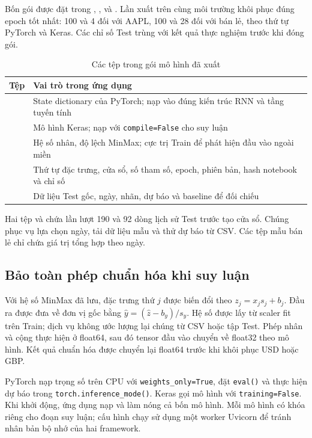 \documentclass[12pt,a4paper]{report}
\begin{document}
Bốn gói được đặt trong , ,  và . Lần xuất trên cùng môi trường khôi phục đúng epoch tốt nhất: 100 và 4 đối với AAPL, 100 và 28 đối với bán lẻ, theo thứ tự PyTorch và Keras. Các chỉ số Test trùng với kết quả thực nghiệm trước khi đóng gói.

\begin{table}[H]\centering\small
\caption{Các tệp trong gói mô hình đã xuất}\label{tab:deployment-artifacts}
\begin{tabularx}{\linewidth}{@{}p{3.6cm}Y@{}}\toprule
Tệp & Vai trò trong ứng dụng \\\midrule
{} & State dictionary của PyTorch; nạp vào đúng kiến trúc RNN và tầng tuyến tính \\
 & Mô hình Keras; nạp với \texttt{compile=False} cho suy luận \\
 & Hệ số nhân, độ lệch MinMax; cực trị Train để phát hiện đầu vào ngoài miền \\
 & Thứ tự đặc trưng, cửa sổ, số tham số, epoch, phiên bản, hash notebook và chỉ số \\
 & Dữ liệu Test gốc, ngày, nhãn, dự báo và baseline để đối chiếu \\\bottomrule
\end{tabularx}
\end{table}

Hai tệp  và  chứa lần lượt 190 và 92 dòng lịch sử Test trước tạo cửa sổ. Chúng phục vụ lựa chọn ngày, tải dữ liệu mẫu và thử dự báo từ CSV. Các tệp mẫu bán lẻ chỉ chứa giá trị tổng hợp theo ngày.

\subsection{Bảo toàn phép chuẩn hóa khi suy luận}
Với hệ số MinMax đã lưu, đặc trưng thứ $j$ được biến đổi theo $z_j=x_j s_j+b_j$. Đầu ra được đưa về đơn vị gốc bằng $\widehat{y}=(\widehat{z}-b_y)/s_y$. Hệ số được lấy từ scaler fit trên Train; dịch vụ không ước lượng lại chúng từ CSV hoặc tập Test. Phép nhân và cộng thực hiện ở float64, sau đó tensor đầu vào chuyển về float32 theo mô hình. Kết quả chuẩn hóa được chuyển lại float64 trước khi khôi phục USD hoặc GBP.

PyTorch nạp trọng số trên CPU với \texttt{weights\_only=True}, đặt \texttt{eval()} và thực hiện dự báo trong \texttt{torch.inference\_mode()}. Keras gọi mô hình với \texttt{training=False}. Khi khởi động, ứng dụng nạp và làm nóng cả bốn mô hình. Mỗi mô hình có khóa riêng cho đoạn suy luận; cấu hình chạy sử dụng một worker Uvicorn để tránh nhân bản bộ nhớ của hai framework.
\end{document}
